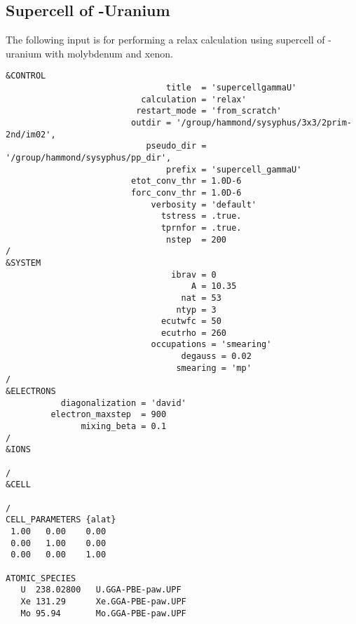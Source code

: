 \subsection{Supercell of \textgamma-Uranium}
The following input is for performing a relax calculation using supercell of \mbox{\textgamma-uranium} with molybdenum and xenon.
\lstset{style=atpw}
\begin{lstlisting}
&CONTROL
                                title  = 'supercellgammaU'
                           calculation = 'relax'
                          restart_mode = 'from_scratch'
                         outdir = '/group/hammond/sysyphus/3x3/2prim-2nd/im02',
                            pseudo_dir = '/group/hammond/sysyphus/pp_dir',
                                prefix = 'supercell_gammaU'
                         etot_conv_thr = 1.0D-6
                         forc_conv_thr = 1.0D-6
                             verbosity = 'default'
                               tstress = .true.
                               tprnfor = .true.
                                nstep  = 200
/
&SYSTEM
                                 ibrav = 0
                                     A = 10.35
                                   nat = 53
                                  ntyp = 3
                               ecutwfc = 50
                               ecutrho = 260
                             occupations = 'smearing'
                                   degauss = 0.02
                                  smearing = 'mp'
/
&ELECTRONS
           diagonalization = 'david'
         electron_maxstep  = 900
               mixing_beta = 0.1
/
&IONS

/
&CELL

/
CELL_PARAMETERS {alat}
 1.00   0.00    0.00
 0.00   1.00    0.00
 0.00   0.00    1.00

ATOMIC_SPECIES
   U  238.02800   U.GGA-PBE-paw.UPF
   Xe 131.29      Xe.GGA-PBE-paw.UPF
   Mo 95.94       Mo.GGA-PBE-paw.UPF


\end{lstlisting}
